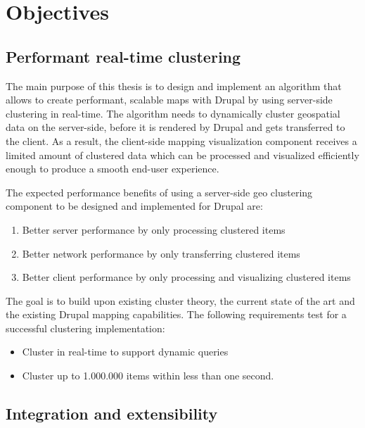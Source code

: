 
%
%

\chapter{Objectives}
\label{chapter:objectives}


\section{Performant real-time clustering}
\label{chapter:objective-performance}

The main purpose of this thesis is to design and implement an algorithm that allows to create performant, scalable maps with Drupal by using server-side clustering in real-time. The algorithm needs to dynamically cluster geospatial data on the server-side, before it is rendered by Drupal and gets transferred to the client. As a result, the client-side mapping visualization component receives a limited amount of clustered data which can be processed and visualized efficiently enough to produce a smooth end-user experience.

The expected performance benefits of using a server-side geo clustering component to be designed and implemented for Drupal are:

\begin{enumerate}

\item Better server performance by only processing clustered items
\item Better network performance by only transferring clustered items 
\item Better client performance by only processing and visualizing clustered items 

\end{enumerate}

The goal is to build upon existing cluster theory, the current state of the art and the existing Drupal mapping capabilities. The following requirements test for a successful clustering implementation:

\begin{itemize}

\item Cluster in real-time to support dynamic queries
\item Cluster up to 1.000.000 items within less than one second.

\end{itemize}


\section{Integration and extensibility}
\label{chapter:objective-integration}

